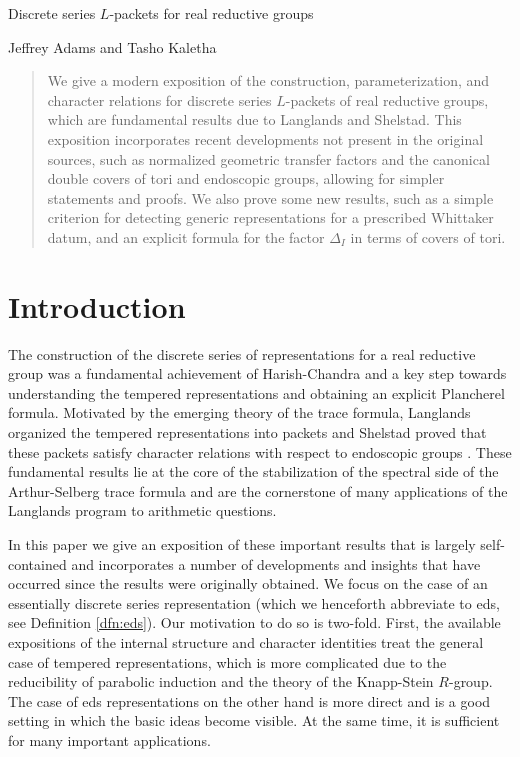 \documentclass{article}
\theoremstyle{definition}
\numberwithin{equation}{section}
\renewcommand{\-}{\hyp{}}
\begin{document}
\begin{mytitle} Discrete series $L$\-packets for real reductive groups \end{mytitle}
\begin{center} Jeffrey Adams and Tasho Kaletha \end{center}

{\let\thefootnote\relax{}}


\begin{abstract}
We give a modern exposition of the construction, parameterization, and character relations for discrete series $L$\-packets of real reductive groups, which are fundamental results due to Langlands and Shelstad. This exposition incorporates recent developments not present in the original sources, such as normalized geometric transfer factors and the canonical double covers of tori and endoscopic groups, allowing for simpler statements and proofs. We also prove some new results, such as a simple criterion for detecting generic representations for a prescribed Whittaker datum, and an explicit formula for the factor $\Delta_I$ in terms of covers of tori.
\end{abstract}

\tableofcontents

\section{Introduction}

The construction of the discrete series of representations  for a real reductive group was a fundamental achievement of Harish-Chandra and a key step towards understanding the tempered representations and obtaining an explicit Plancherel formula. Motivated by the emerging theory of the trace formula, Langlands organized the tempered representations into packets \cite{Lan89} and Shelstad proved that these packets satisfy character relations with respect to endoscopic groups \cite{She82}. These fundamental results lie at the core of the stabilization of the spectral side of the Arthur-Selberg trace formula and are the cornerstone of many applications of the Langlands program to arithmetic questions. 

In this paper we give an exposition of these important results that is largely self-contained and incorporates a number of developments and insights that have occurred since the results were originally obtained. We focus on the case of an essentially discrete series representation (which we henceforth abbreviate to eds, see Definition \ref{dfn:eds}). Our motivation to do so is two-fold. First, the available expositions of the internal structure and character identities treat the general case of tempered representations, which is more complicated due to the reducibility of parabolic induction and the theory of the Knapp-Stein $R$-group. The case of eds representations on the other hand is more direct and is a good setting in which the basic ideas become visible. At the same time, it is sufficient for many important applications.
\end{document}
